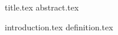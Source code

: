 \documentclass[11pt]{llncs}
\begin{document}
{title.tex}
\thispagestyle{plain}
{abstract.tex}

{introduction.tex}
{definition.tex}



\end{document}

